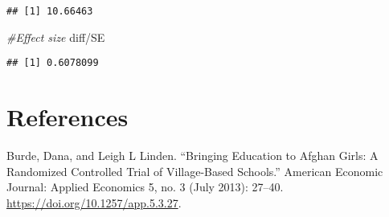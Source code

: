 \documentclass[
]{article}
\newenvironment{Shaded}{\begin{snugshade}}{\end{snugshade}}
\newcommand{\CommentTok}[1]{\textcolor[rgb]{0.56,0.35,0.01}{\textit{#1}}}
\newcommand{\DecValTok}[1]{\textcolor[rgb]{0.00,0.00,0.81}{#1}}
\newcommand{\FunctionTok}[1]{\textcolor[rgb]{0.00,0.00,0.00}{#1}}
\newcommand{\NormalTok}[1]{#1}
\newcommand{\OtherTok}[1]{\textcolor[rgb]{0.56,0.35,0.01}{#1}}
\newcommand{\SpecialCharTok}[1]{\textcolor[rgb]{0.00,0.00,0.00}{#1}}
\begin{document}
\begin{Shaded}
\end{Shaded}

\begin{verbatim}
## [1] 10.66463
\end{verbatim}

\begin{Shaded}
\begin{Highlighting}[]
\CommentTok{\#Effect size}
\NormalTok{diff}\SpecialCharTok{/}\NormalTok{SE             }
\end{Highlighting}
\end{Shaded}

\begin{verbatim}
## [1] 0.6078099
\end{verbatim}

\hypertarget{references}{%
\section{References}\label{references}}

Burde, Dana, and Leigh L Linden. ``Bringing Education to Afghan Girls: A
Randomized Controlled Trial of Village-Based Schools.'' American
Economic Journal: Applied Economics 5, no. 3 (July 2013): 27--40.
\url{https://doi.org/10.1257/app.5.3.27}.
\end{document}
